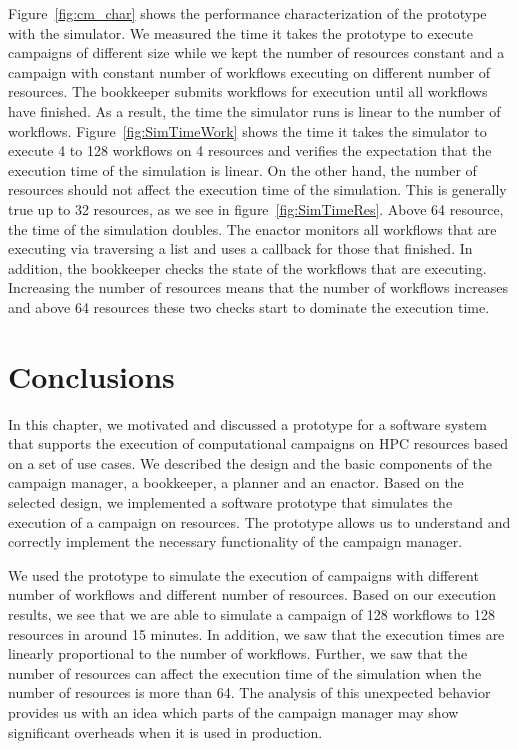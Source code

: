 Figure~\ref{fig:cm_char} shows the performance characterization of the prototype with the simulator.
We measured the time it takes the prototype to execute campaigns of different size while we kept the number of resources constant and a campaign with constant number of workflows executing on different number of resources.
The bookkeeper submits workflows for execution until all workflows have finished.
As a result, the time the simulator runs is linear to the number of workflows.
Figure~\ref{fig:SimTimeWork} shows the time it takes the simulator to execute 4 to 128 workflows on 4 resources and verifies the expectation that the execution time of the simulation is linear.
On the other hand, the number of resources should not affect the execution time of the simulation.
This is generally true up to 32 resources, as we see in figure~\ref{fig:SimTimeRes}.
Above 64 resource, the time of the simulation doubles.
The enactor monitors all workflows that are executing via traversing a list and uses a callback for those that finished.
In addition, the bookkeeper checks the state of the workflows that are executing.
Increasing the number of resources means that the number of workflows increases and above 64 resources these two checks start to dominate the execution time.



\section{Conclusions}

In this chapter, we motivated and discussed a prototype for a software system that supports the execution of computational campaigns on HPC resources based on a set of use cases.
We described the design and the basic components of the campaign manager, a bookkeeper, a planner and an enactor.
Based on the selected design, we implemented a software prototype that simulates the execution of a campaign on resources.
The prototype allows us to understand and correctly implement the necessary functionality of the campaign manager.

We used the prototype to simulate the execution of campaigns with different number of workflows and different number of resources.
Based on our execution results, we see that we are able to simulate a campaign of 128 workflows to 128 resources in around 15 minutes.
In addition, we saw that the execution times are linearly proportional to the number of workflows.
Further, we saw that the number of resources can affect the execution time of the simulation when the number of resources is more than 64.
The analysis of this unexpected behavior provides us with an idea which parts of the campaign manager may show significant overheads when it is used in production.

